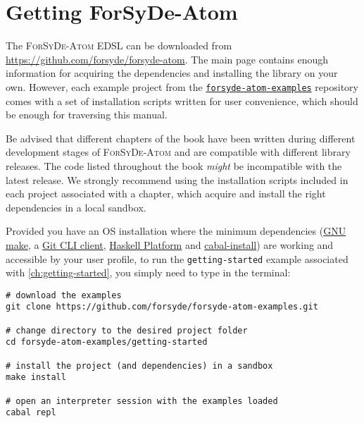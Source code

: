 
\section{Getting {{\sc ForSyDe-Atom}}}
\label{sec:getting-forsyde-atom}

The \textsc{ForSyDe-Atom} EDSL can be downloaded from \url{https://github.com/forsyde/forsyde-atom}. The main page contains enough information for acquiring the dependencies and installing the library on your own. However, each example project from the \href{https://github.com/forsyde/forsyde-atom-examples}{\texttt{forsyde-atom-examples}} repository comes with a set of installation scripts written for user convenience, which should be enough for traversing this manual.

\begin{mdframed}[style=attention,frametitle=Attention!]
Be advised that different chapters of the book have been written during different development stages of \textsc{ForSyDe-Atom} and are compatible with different library releases. The code listed throughout the book \emph{might} be incompatible with the latest release. We strongly recommend using the installation scripts included in each project associated with a chapter, which acquire and install the right dependencies in a local sandbox.
\end{mdframed}

Provided you have an OS installation where the minimum dependencies (\href{https://www.gnu.org/software/make/}{GNU make}, a \href{https://git-scm.com/downloads}{Git CLI client}, \href{https://www.haskell.org/platform/}{Haskell Platform} and \href{https://www.haskell.org/cabal/download.html}{cabal-install}) are working and accessible by your user profile, to run the \texttt{getting-started} example associated with \cref{ch:getting-started}, you simply need to type in the terminal:

\begin{verbatim}
# download the examples
git clone https://github.com/forsyde/forsyde-atom-examples.git

# change directory to the desired project folder
cd forsyde-atom-examples/getting-started

# install the project (and dependencies) in a sandbox
make install

# open an interpreter session with the examples loaded
cabal repl
\end{verbatim}

